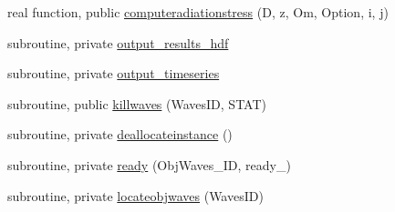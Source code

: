 \begin{DoxyCompactItemize}
\item 
real function, public \mbox{\hyperlink{namespacemodulewaves_a5f64bacf936301755ac7472613db2a12}{computeradiationstress}} (D, z, Om, Option, i, j)
\item 
subroutine, private \mbox{\hyperlink{namespacemodulewaves_a89f925f57b1b3b8af0ce6bb51398f224}{output\+\_\+results\+\_\+hdf}}
\item 
subroutine, private \mbox{\hyperlink{namespacemodulewaves_ad7f81476715cc55364572aacbf0b2696}{output\+\_\+timeseries}}
\item 
subroutine, public \mbox{\hyperlink{namespacemodulewaves_ac7cfc1f43634cac51c36130e5d101c5d}{killwaves}} (Waves\+ID, S\+T\+AT)
\item 
subroutine, private \mbox{\hyperlink{namespacemodulewaves_ae0f81c5ccbee665024d621b4578f59ed}{deallocateinstance}} ()
\item 
subroutine, private \mbox{\hyperlink{namespacemodulewaves_a15beb6e5dff252a4c77c47d43f9b6385}{ready}} (Obj\+Waves\+\_\+\+ID, ready\+\_\+)
\item 
subroutine, private \mbox{\hyperlink{namespacemodulewaves_a0b543189e013d4ce00f78f873ab7f481}{locateobjwaves}} (Waves\+ID)
\end{DoxyCompactItemize}
